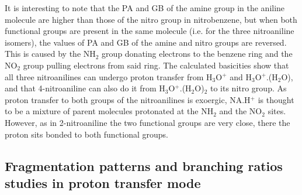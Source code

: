 It is interesting to note that the PA and GB of the amine group in the  aniline molecule are higher than those of the nitro group in nitrobenzene, but when both functional groups are present in the same molecule (i.e. for the three nitroaniline isomers), the values of PA and GB of the amine and nitro groups are reversed.%
This is caused by the NH$_2$ group donating electrons to the benzene ring and the NO$_2$ group pulling electrons from said ring. 
The calculated basicities show that all three nitroanilines can undergo proton transfer from H$_3$O$^+$ and H$_3$O$^+$.(H$_2$O), and that 4-nitroaniline can also do it from H$_3$O$^+$.(H$_2$O)$_2$ to its nitro group.
As proton transfer to both groups of the nitroanilines is exoergic, NA.H$^+$ is thought to be a mixture of parent molecules protonated at the NH$_2$ and the NO$_2$ sites. However, as in 2-nitroaniline the two functional groups are very close, there the proton sits bonded to both functional groups.





\subsection{Fragmentation patterns and branching ratios studies in proton transfer mode}

